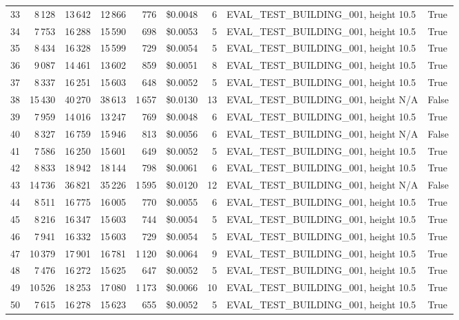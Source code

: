 \documentclass[a4paper,11pt]{article}
\begin{document}
\begin{table}[ht]
\begin{tabular}{r r r r r r r p{3cm} l}
33 & 8\,128 & 13\,642 & 12\,866 & 776 & \$0.0048 & 6 & EVAL\_TEST\_BUILDING\_001, height 10.5 & True \\
34 & 7\,753 & 16\,288 & 15\,590 & 698 & \$0.0053 & 5 & EVAL\_TEST\_BUILDING\_001, height 10.5 & True \\
35 & 8\,434 & 16\,328 & 15\,599 & 729 & \$0.0054 & 5 & EVAL\_TEST\_BUILDING\_001, height 10.5 & True \\
36 & 9\,087 & 14\,461 & 13\,602 & 859 & \$0.0051 & 8 & EVAL\_TEST\_BUILDING\_001, height 10.5 & True \\
37 & 8\,337 & 16\,251 & 15\,603 & 648 & \$0.0052 & 5 & EVAL\_TEST\_BUILDING\_001, height 10.5 & True \\
38 & 15\,430 & 40\,270 & 38\,613 & 1\,657 & \$0.0130 & 13 & EVAL\_TEST\_BUILDING\_001, height N/A & False \\
39 & 7\,959 & 14\,016 & 13\,247 & 769 & \$0.0048 & 6 & EVAL\_TEST\_BUILDING\_001, height 10.5 & True \\
40 & 8\,327 & 16\,759 & 15\,946 & 813 & \$0.0056 & 6 & EVAL\_TEST\_BUILDING\_001, height N/A & False \\
41 & 7\,586 & 16\,250 & 15\,601 & 649 & \$0.0052 & 5 & EVAL\_TEST\_BUILDING\_001, height 10.5 & True \\
42 & 8\,833 & 18\,942 & 18\,144 & 798 & \$0.0061 & 6 & EVAL\_TEST\_BUILDING\_001, height 10.5 & True \\
43 & 14\,736 & 36\,821 & 35\,226 & 1\,595 & \$0.0120 & 12 & EVAL\_TEST\_BUILDING\_001, height N/A & False \\
44 & 8\,511 & 16\,775 & 16\,005 & 770 & \$0.0055 & 6 & EVAL\_TEST\_BUILDING\_001, height 10.5 & True \\
45 & 8\,216 & 16\,347 & 15\,603 & 744 & \$0.0054 & 5 & EVAL\_TEST\_BUILDING\_001, height 10.5 & True \\
46 & 7\,941 & 16\,332 & 15\,603 & 729 & \$0.0054 & 5 & EVAL\_TEST\_BUILDING\_001, height 10.5 & True \\
47 & 10\,379 & 17\,901 & 16\,781 & 1\,120 & \$0.0064 & 9 & EVAL\_TEST\_BUILDING\_001, height 10.5 & True \\
48 & 7\,476 & 16\,272 & 15\,625 & 647 & \$0.0052 & 5 & EVAL\_TEST\_BUILDING\_001, height 10.5 & True \\
49 & 10\,526 & 18\,253 & 17\,080 & 1\,173 & \$0.0066 & 10 & EVAL\_TEST\_BUILDING\_001, height 10.5 & True \\
50 & 7\,615 & 16\,278 & 15\,623 & 655 & \$0.0052 & 5 & EVAL\_TEST\_BUILDING\_001, height 10.5 & True \\

\end{tabular}
\end{table}
\end{document}

